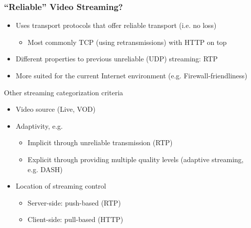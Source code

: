 \documentclass{beamer}
\begin{document}
\begin{frame}
	\frametitle{``Reliable'' Video Streaming?}

	\begin{itemize}
		\item Uses transport protocols that offer reliable transport (i.e. no loss)
			\begin{itemize}
				\item Most commonly TCP (using retransmissions) with HTTP on top
			\end{itemize}
		\item Different properties to previous unreliable (UDP) streaming: RTP
		\item More suited for the current Internet environment (e.g. Firewall-friendliness)
	\end{itemize}

	Other streaming categorization criteria
	\begin{itemize}
		\item Video source (Live, VOD)
		\item Adaptivity, e.g.
			\begin{itemize}
				\item Implicit through unreliable transmission (RTP)
				\item Explicit through providing multiple quality levels (adaptive streaming, e.g. DASH)
			\end{itemize}
		\item Location of streaming control
			\begin{itemize}
				\item Server-side: push-based (RTP)
				\item Client-side: pull-based (HTTP)
			\end{itemize}
	\end{itemize}
\end{frame}


\end{document}

